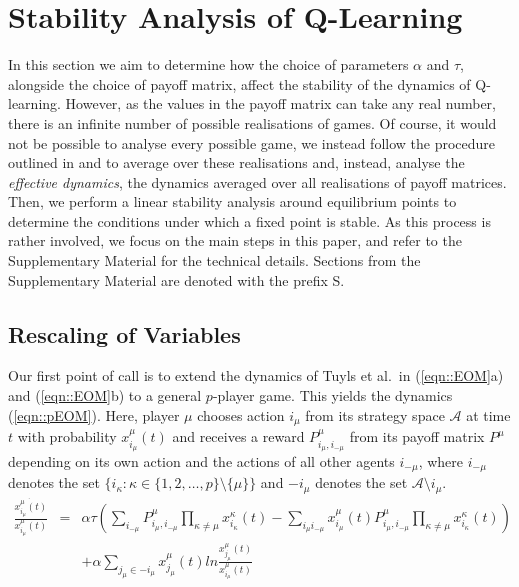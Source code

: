 \documentclass[sigconf,anonymous]{aamas}
\newcommand{\xmu}[2]{x_{#1_#2}^{#2}(t)}
\newcommand{\payoff}[2]{P^{#2}_{#1_#2, #1_{-#2}}}
\begin{document}

\section{Stability Analysis of Q-Learning} \label{sec::Theory}

In this section we aim to determine how the choice of parameters
$\alpha$ and $\tau$, alongside the choice of payoff matrix, affect the
stability of the dynamics of Q-learning. However, as the values in the
payoff matrix can take any real number, there is an infinite number
of possible realisations of games. Of course, it would not be possible
to analyse every possible game, we instead follow the procedure
outlined in \cite{Coolen2005} and \cite{Galla2013} to average over
these realisations and, instead, analyse the \textit{effective
  dynamics}, the dynamics averaged over all realisations of payoff
matrices. Then, we perform a linear stability analysis around
equilibrium points to determine the conditions under which a fixed
point is stable. As this process is rather involved, we focus on the main steps in this paper, and refer to the Supplementary Material for the technical details. Sections from the Supplementary Material are denoted with the prefix S.

\subsection{Rescaling of Variables}


Our first point of call is to extend the dynamics of Tuyls et al.~in
(\ref{eqn::EOM}a) and (\ref{eqn::EOM}b) to a general $p$-player
game. This yields the dynamics (\ref{eqn::pEOM}). Here, player $\mu$
chooses action $i_{\mu}$ from its strategy space $\mathcal{A}$ at time
$t$ with probability $\xmu{i}{\mu}$ and receives a reward
$\payoff{i}{\mu}$ from its payoff matrix $P^\mu$ depending on its own
action and the actions of all other agents $i_{-\mu}$, where $i_{-\mu}$ denotes the set $\{ i_\kappa : \kappa \in \{1, 2,
\ldots , p\} \setminus \{\mu\} \}$ and $-i_{\mu}$ denotes the set
$\mathcal{A} \setminus {i_\mu}$.
%
\begin{eqnarray}
    \frac{\dot{\xmu{i}{\mu}}}{\xmu{i}{\mu}} \! \! \! \! \! \! & = \! \! \! \! \! \! & \alpha \tau \left( \sum_{i_{-\mu}} \payoff{i}{\mu} \prod_{\kappa \neq \mu} \xmu{i}{\kappa} -  \sum_{i_\mu i_{-\mu}} \xmu{i}{\mu} \payoff{i}{\mu} \prod_{\kappa \neq \mu} \xmu{i}{\kappa} \right) \nonumber \\
    & & + \alpha \sum_{j_\mu \in -i_\mu} \xmu{j}{\mu} ln \frac{\xmu{j}{\mu}}{\xmu{i}{\mu}}     \label{eqn::pEOM}
\end{eqnarray}
\end{document}
